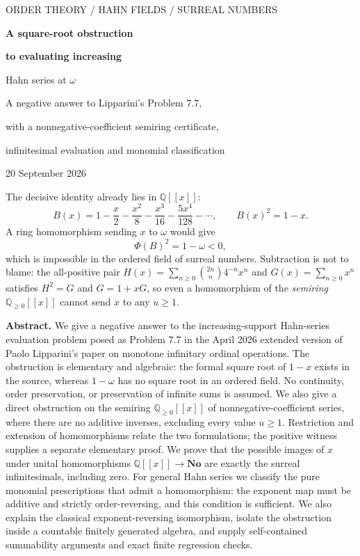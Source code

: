 \documentclass[11pt,letterpaper]{article}
\theoremstyle{definition}
\theoremstyle{remark}
\newcommand{\No}{\mathbf{No}}
\newcommand{\Q}{\mathbb Q}
\newcommand{\Qnn}{\Q_{\ge0}}
\begin{document}
\hypersetup{pageanchor=false}%
\begin{titlepage}
\thispagestyle{empty}
\vspace*{0.05in}
{\color{OliveDark}\small\sffamily ORDER THEORY \; / \; HAHN FIELDS \; / \; SURREAL NUMBERS\par}
\vspace{0.28in}
{\Huge\bfseries A square-root obstruction\par}
\vspace{.12in}
{\LARGE\bfseries to evaluating increasing\par Hahn series at $\omega$\par}
\vspace{.28in}
{\large A negative answer to Lipparini's Problem 7.7,\par
with a nonnegative-coefficient semiring certificate,\par
infinitesimal evaluation and monomial classification\par}
\vspace{.22in}
{\color{Quiet}20 September 2026\par}
\vspace{.2in}
\begin{resultbox}
The decisive identity already lies in $\Q[[x]]$:
\[
 B(x)=1-\frac{x}{2}-\frac{x^2}{8}-\frac{x^3}{16}-\frac{5x^4}{128}-\cdots,
 \qquad B(x)^2=1-x.
\]
A ring homomorphism sending $x$ to $\omega$ would give
\[
 \Phi(B)^2=1-\omega<0,
\]
which is impossible in the ordered field of surreal numbers.
Subtraction is not to blame: the all-positive pair
$H(x)=\sum_{n\ge0}\binom{2n}{n}4^{-n}x^n$ and $G(x)=\sum_{n\ge0}x^n$
satisfies $H^2=G$ and $G=1+xG$, so even a homomorphism of the
\emph{semiring} $\Qnn[[x]]$ cannot send $x$ to any $u\ge1$.
\end{resultbox}
\vspace{.25in}
\noindent\textbf{Abstract.}
We give a negative answer to the increasing-support Hahn-series evaluation problem
posed as Problem 7.7 in the April 2026 extended version of Paolo Lipparini's paper
on monotone infinitary ordinal operations. The obstruction is elementary and
algebraic: the formal square root of $1-x$ exists in the source, whereas $1-\omega$
has no square root in an ordered field. No continuity, order preservation, or
preservation of infinite sums is assumed. We also give a direct obstruction
on the semiring $\Qnn[[x]]$ of nonnegative-coefficient series, where there
are no additive inverses, excluding every value $u\ge1$. Restriction and
extension of homomorphisms relate the two formulations; the positive witness
supplies a separate elementary proof. We prove that the possible
images of $x$ under unital homomorphisms $\Q[[x]]\to\No$ are exactly the surreal
infinitesimals, including zero. For general Hahn series we classify the pure
monomial prescriptions that admit a homomorphism: the exponent map must be
additive and strictly order-reversing, and this condition is sufficient. We also
explain the classical exponent-reversing isomorphism, isolate the obstruction
inside a countable finitely generated algebra, and supply self-contained
summability arguments and exact finite regression checks.


\end{titlepage}
\end{document}

